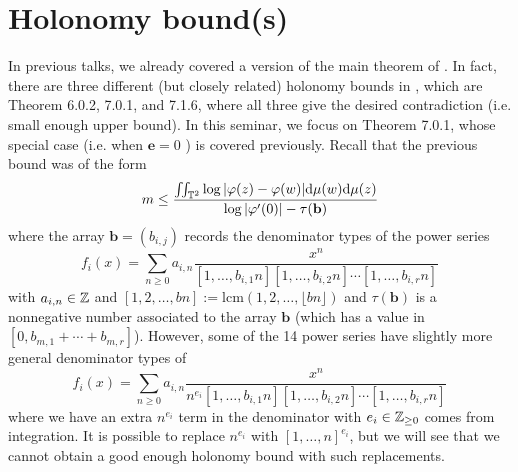 \section{Holonomy bound(s)}

In previous talks, we already covered a version of the main theorem of \cite{calegari2024linear}.
In fact, there are three different (but closely related) holonomy bounds in \cite{calegari2024linear}, which are Theorem 6.0.2, 7.0.1, and 7.1.6, where all three give the desired contradiction (i.e. small enough upper bound).
In this seminar, we focus on Theorem 7.0.1, whose special case (i.e. when $\mathbf{e} = 0$ \cite[Theorem 2.5.1]{calegari2024linear}) is covered previously.
Recall that the previous bound was of the form
\begin{equation}
\label{eqn:holonomybounde0}
    m \le \frac{\iint_{\mathbb{T}^2} \log |\varphi(z) - \varphi(w)| \mathrm{d} \mu(w) \mathrm{d} \mu(z)}{\log |\varphi'(0)| - \tau(\mathbf{b})}
\end{equation}
where the array $\mathbf{b} = (b_{i, j})$ records the denominator types of the power series
$$
    f_i(x) = \sum_{n \ge 0} a_{i, n} \frac{x^n}{[1, \dots, b_{i, 1} n] [1, \dots, b_{i, 2}n] \cdots [1, \dots, b_{i, r}n]}
$$
with $a_{i,n} \in \mathbb{Z}$ and $[1, 2, \dots, bn] := \mathrm{lcm}(1, 2, \dots, \lfloor bn \rfloor)$ and $\tau(\mathbf{b})$ is a nonnegative number associated to the array $\mathbf{b}$ (which has a value in $[0, b_{m, 1} + \cdots + b_{m, r}]$).
However, some of the 14 power series have slightly more general denominator types of
$$
    f_i(x) = \sum_{n \ge 0} a_{i, n} \frac{x^n}{n^{e_i}[1, \dots, b_{i, 1} n] [1, \dots, b_{i, 2}n] \cdots [1, \dots, b_{i, r}n]}
$$
where we have an extra $n^{e_i}$ term in the denominator with $e_i \in \mathbb{Z}_{\ge 0}$ comes from integration.
It is possible to replace $n^{e_i}$ with $[1, \dots, n]^{e_i}$, but we will see that we cannot obtain a good enough holonomy bound with such replacements.


